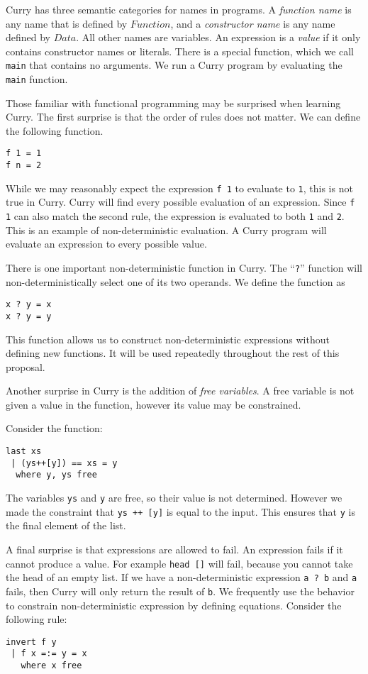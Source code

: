 Curry has three semantic categories for names in programs.
A \textit{function name} is any name that is defined by $Function$, and a \textit{constructor name}
is any name defined by $Data$.  All other names are variables.
An expression is a \textit{value} if it only contains constructor names or literals.
There is a special function, which we call \texttt{main} that contains no arguments.
We run a Curry program by evaluating the \texttt{main} function.

Those familiar with functional programming may be surprised when learning Curry.
The first surprise is that the order of rules does not matter.
We can define the following function.
\begin{verbatim}
f 1 = 1
f n = 2
\end{verbatim}

While we may reasonably expect the expression \texttt{f 1} to evaluate to \texttt 1, this is not true in Curry.
Curry will find every possible evaluation of an expression.
Since \texttt{f 1} can also match the second rule, the expression is evaluated to both \texttt 1 and \texttt 2.
This is an example of non-deterministic evaluation.
A Curry program will evaluate an expression to every possible value.

There is one important non-deterministic function in Curry.
The ``\texttt{?}'' function will non-deterministically select one of its two operands.
We define the function as

\begin{verbatim}
x ? y = x
x ? y = y
\end{verbatim}

This function allows us to construct non-deterministic expressions without defining new functions.
It will be used repeatedly throughout the rest of this proposal.

Another surprise in Curry is the addition of \textit{free variables}.
A free variable is not given a value in the function, however its value may be constrained.

Consider the function:
\begin{verbatim}
last xs
 | (ys++[y]) == xs = y
  where y, ys free
\end{verbatim}

The variables \texttt{ys} and \texttt y are free, so their value is not determined.
However we made the constraint that \texttt{ys ++ [y]} is equal to the input.
This ensures that \texttt y is the final element of the list.

A final surprise is that expressions are allowed to fail.
An expression fails if it cannot produce a value.
For example \texttt{head []} will fail, because you cannot take the head of an empty list.
If we have a non-deterministic expression \texttt{a ? b} and \texttt a fails, then Curry will only return the result of \texttt b.
We frequently use the behavior to constrain non-deterministic expression by defining equations.
Consider the following rule:
\begin{verbatim}
invert f y
 | f x =:= y = x
   where x free
\end{verbatim}

